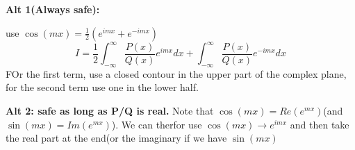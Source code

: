 \documentclass[a4paper,norsk, 10pt]{article}
\begin{document}
\textbf{Alt 1(Always safe):}

use $\cos(mx) = \frac{1}{2}(e^{imx} + e^{-imx})$
\begin{equation}
I = \frac{1}{2}\int_{-\infty}^{\infty} \frac{P(x)}{Q(x)}e^{imx}dx + \int_{-\infty}^{\infty} \frac{P(x)}{Q(x)}e^{-imx}dx
\end{equation}
FOr the first term, use a closed contour in the upper part of the complex plane, for the second term use one in the lower half.

\textbf{Alt 2: safe as long as P/Q is real.}
Note that $\cos(mx) = Re (e^{mx})$(and $\sin(mx) = Im (e^{mx})$). We can therfor use $\cos(mx) \rightarrow e^{imx}$ and then take the real part at the end(or the imaginary if we have $\sin(mx)$
\end{document}
